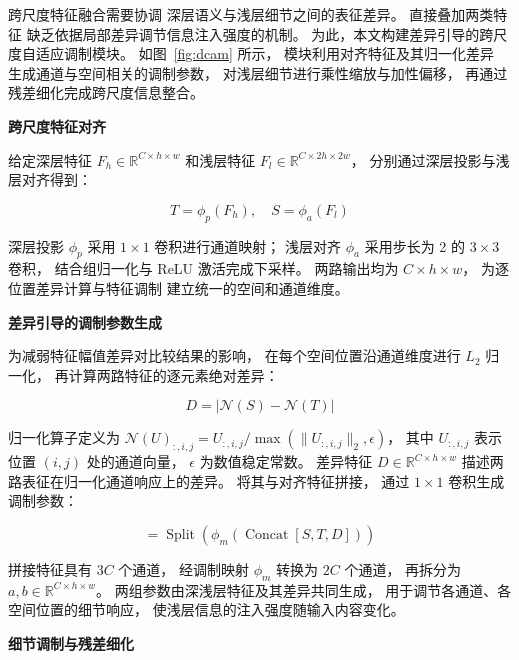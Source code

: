 跨尺度特征融合需要协调
深层语义与浅层细节之间的表征差异。
直接叠加两类特征
缺乏依据局部差异调节信息注入强度的机制。
为此，本文构建差异引导的跨尺度自适应调制模块。
如图~\ref{fig:dcam} 所示，
模块利用对齐特征及其归一化差异
生成通道与空间相关的调制参数，
对浅层细节进行乘性缩放与加性偏移，
再通过残差细化完成跨尺度信息整合。

\noindent\textbf{跨尺度特征对齐}\par

给定深层特征
\(F_h\in\mathbb{R}^{C\times h\times w}\)
和浅层特征
\(F_l\in\mathbb{R}^{C\times2h\times2w}\)，
分别通过深层投影与浅层对齐得到：

\begin{equation}
T=\phi_p(F_h),\quad S=\phi_a(F_l)
\label{eq:dcam-alignment}
\end{equation}

深层投影 \(\phi_p\)
采用 \(1\times1\) 卷积进行通道映射；
浅层对齐 \(\phi_a\)
采用步长为 2 的 \(3\times3\) 卷积，
结合组归一化与 ReLU 激活完成下采样。
两路输出均为 \(C\times h\times w\)，
为逐位置差异计算与特征调制
建立统一的空间和通道维度。

\noindent\textbf{差异引导的调制参数生成}\par

为减弱特征幅值差异对比较结果的影响，
在每个空间位置沿通道维度进行 \(L_2\) 归一化，
再计算两路特征的逐元素绝对差异：

\begin{equation}
D=\left|\mathcal{N}(S)-\mathcal{N}(T)\right|
\label{eq:dcam-discrepancy}
\end{equation}

归一化算子定义为
\(\mathcal{N}(U)_{:,i,j}
=U_{:,i,j}/\max(\lVert U_{:,i,j}\rVert_2,\epsilon)\)，
其中 \(U_{:,i,j}\)
表示位置 \((i,j)\) 处的通道向量，
\(\epsilon\) 为数值稳定常数。
差异特征
\(D\in\mathbb{R}^{C\times h\times w}\)
描述两路表征在归一化通道响应上的差异。
将其与对齐特征拼接，
通过 \(1\times1\) 卷积生成调制参数：

\begin{equation}
[a,b]=\operatorname{Split}\left(
\phi_m\left(
\operatorname{Concat}[S,T,D]
\right)\right)
\label{eq:dcam-modulation-parameters}
\end{equation}

拼接特征具有 \(3C\) 个通道，
经调制映射 \(\phi_m\) 转换为 \(2C\) 个通道，
再拆分为
\(a,b\in\mathbb{R}^{C\times h\times w}\)。
两组参数由深浅层特征及其差异共同生成，
用于调节各通道、各空间位置的细节响应，
使浅层信息的注入强度随输入内容变化。

\noindent\textbf{细节调制与残差细化}\par

